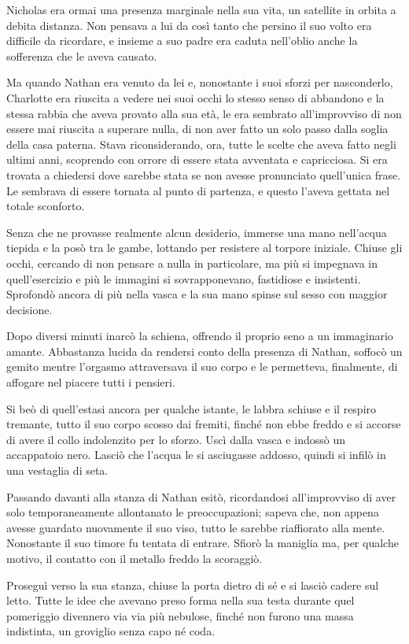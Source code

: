 Nicholas era ormai una presenza marginale nella sua vita, un satellite in orbita a debita distanza.
Non pensava a lui da così tanto che persino il suo volto era difficile da ricordare, e insieme a suo
padre era caduta nell'oblio anche la sofferenza che le aveva causato.

Ma quando Nathan era venuto da lei e, nonostante i suoi sforzi per nasconderlo, Charlotte era
riuscita a vedere nei suoi occhi lo stesso senso di abbandono e la stessa rabbia che aveva provato
alla sua età, le era sembrato all'improvviso di non essere mai riuscita a superare nulla, di non
aver fatto un solo passo dalla soglia della casa paterna. Stava riconsiderando, ora, tutte le scelte
che aveva fatto negli ultimi anni, scoprendo con orrore di essere stata avventata e capricciosa. Si
era trovata a chiedersi dove sarebbe stata se non avesse pronunciato quell'unica frase. Le sembrava
di essere tornata al punto di partenza, e questo l'aveva gettata nel totale sconforto.

Senza che ne provasse realmente alcun desiderio, immerse una mano nell'acqua tiepida e la posò tra
le gambe, lottando per resistere al torpore iniziale. Chiuse gli occhi, cercando di non pensare a
nulla in particolare, ma più si impegnava in quell'esercizio e più le immagini si sovrapponevano,
fastidiose e insistenti. Sprofondò ancora di più nella vasca e la sua mano spinse sul sesso con
maggior decisione.

Dopo diversi minuti inarcò la schiena, offrendo il proprio seno a un immaginario amante. Abbastanza
lucida da rendersi conto della presenza di Nathan, soffocò un gemito mentre l'orgasmo attraversava
il suo corpo e le permetteva, finalmente, di affogare nel piacere tutti i pensieri.

Si beò di quell'estasi ancora per qualche istante, le labbra schiuse e il respiro tremante, tutto il
suo corpo scosso dai fremiti, finché non ebbe freddo e si accorse di avere il collo indolenzito per
lo sforzo. Uscì dalla vasca e indossò un accappatoio nero. Lasciò che l'acqua le si asciugasse
addosso, quindi si infilò in una vestaglia di seta.

Passando davanti alla stanza di Nathan esitò, ricordandosi all'improvviso di aver solo
temporaneamente allontanato le preoccupazioni; sapeva che, non appena avesse guardato nuovamente il
suo viso, tutto le sarebbe riaffiorato alla mente. Nonostante il suo timore fu tentata di entrare.
Sfiorò la maniglia ma, per qualche motivo, il contatto con il metallo freddo la scoraggiò.

Proseguì verso la sua stanza, chiuse la porta dietro di sé e si lasciò cadere sul letto. Tutte le
idee che avevano preso forma nella sua testa durante quel pomeriggio divennero via via più nebulose,
finché non furono una massa indistinta, un groviglio senza capo né coda.
